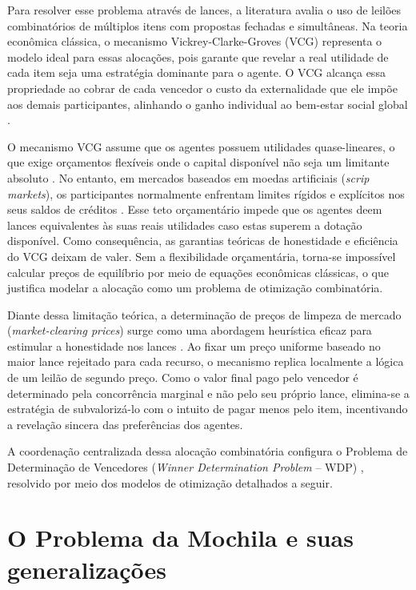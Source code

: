 \documentclass[
    12pt,
    openany,
    oneside,
    a4paper,
    english,
    brazil
]{abntex2}
\begin{document}
Para resolver esse problema através de lances, a literatura avalia o uso de leilões combinatórios de múltiplos itens com propostas fechadas e simultâneas. Na teoria econômica clássica, o mecanismo Vickrey-Clarke-Groves (VCG) representa o modelo ideal para essas alocações, pois garante que revelar a real utilidade de cada item seja uma estratégia dominante para o agente. O VCG alcança essa propriedade ao cobrar de cada vencedor o custo da externalidade que ele impõe aos demais participantes, alinhando o ganho individual ao bem-estar social global \cite{cramton2006}.

O mecanismo VCG assume que os agentes possuem utilidades quase-lineares, o que exige orçamentos flexíveis onde o capital disponível não seja um limitante absoluto \cite{cramton2006}. No entanto, em mercados baseados em moedas artificiais (\textit{scrip markets}), os participantes normalmente enfrentam limites rígidos e explícitos nos seus saldos de créditos \cite{budish2011}. Esse teto orçamentário impede que os agentes deem lances equivalentes às suas reais utilidades caso estas superem a dotação disponível. Como consequência, as garantias teóricas de honestidade e eficiência do VCG deixam de valer. Sem a flexibilidade orçamentária, torna-se impossível calcular preços de equilíbrio por meio de equações econômicas clássicas, o que justifica modelar a alocação como um problema de otimização combinatória.

Diante dessa limitação teórica, a determinação de preços de limpeza de mercado (\textit{market-clearing prices}) surge como uma abordagem heurística eficaz para estimular a honestidade nos lances \cite{budish2011, cramton2006}. Ao fixar um preço uniforme baseado no maior lance rejeitado para cada recurso, o mecanismo replica localmente a lógica de um leilão de segundo preço. Como o valor final pago pelo vencedor é determinado pela concorrência marginal e não pelo seu próprio lance, elimina-se a estratégia de subvalorizá-lo com o intuito de pagar menos pelo item, incentivando a revelação sincera das preferências dos agentes. 

A coordenação centralizada dessa alocação combinatória configura o Problema de Determinação de Vencedores (\textit{Winner Determination Problem} -- WDP) \cite{cramton2006}, resolvido por meio dos modelos de otimização detalhados a seguir.

\section{O Problema da Mochila e suas generalizações}
\label{sec:problema_mochila}
\end{document}
